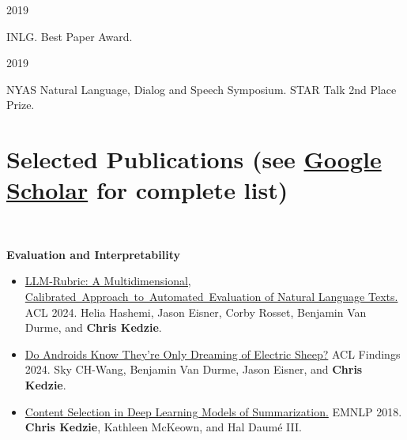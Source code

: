 \documentclass[letterpaper,11pt]{article}
\begin{document}
\noindent \parbox{6em}{2019} INLG. Best Paper Award. 

\noindent \parbox{6em}{2019} NYAS Natural Language, Dialog and Speech  Symposium. STAR Talk 2nd Place Prize.\\
  




\clearpage

\section{Selected Publications (see \href{https://scholar.google.com/citations?hl=en&user=-xcIYgsAAAAJ}{Google Scholar} for complete list)}
\newcommand{\nlgcolor}{Maroon}
\newcommand{\evalcolor}{Green}
\newcommand{\mtcolor}{Blue}
\newcommand{\extsumcolor}{RoyalPurple}
\newcommand{\socialnlpcolor}{magenta}
\newcommand{\PubEntry}[5]{\noindent\hangindent=0em\hangafter=0 #3\\ {\textit{#4.}} #1. \\ ~\\} 
\newcommand{\PubEntryInline}[5]{\noindent\hangindent=0em\hangafter=0 \href{#2}{\color{#5}{#3}} {\textit{#4.}} #1.} 
\newcommand{\PubEntryAward}[6]{\noindent\hangindent=0em\hangafter=0 \href{#2}{\color{#5}{#3}} {\textit{#4 -- {#6}.}} #1. \\ ~\\} 
\newcommand{\MarginSection}[1]{\marginpar{#1}} 

~\\
\small 

\textbf{Evaluation and Interpretability}\\

\begin{itemize}[leftmargin=6.0mm]
\item {\href{https://aclanthology.org/2024.acl-long.745v2.pdf}{LLM-Rubric: A Multidimensional, Calibrated~Approach~to~Automated~Evaluation of Natural Language Texts.}} ACL 2024.
Helia Hashemi, Jason Eisner, Corby Rosset, Benjamin Van Durme, and \textbf{Chris Kedzie}.\\


\item \href{https://aclanthology.org/2024.findings-acl.260.pdf}{Do Androids Know They're Only Dreaming of Electric Sheep?} ACL Findings 2024.
Sky CH-Wang, Benjamin Van Durme, Jason Eisner, and \textbf{Chris Kedzie}.\\


\item \href{https://www.aclweb.org/anthology/D18-1208v2.pdf}{Content Selection in Deep Learning Models of Summarization.} EMNLP 2018.
\textbf{Chris Kedzie}, Kathleen McKeown, and Hal Daum\'e III.
\end{itemize}
\end{document}
